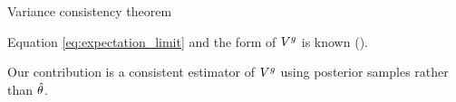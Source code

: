 \begin{frame}[t]{Variance consistency theorem}

\pause
Equation \ref{eq:expectation_limit} and the form of  $V^g$ is known (\citep{kleijn:2012:bvm}).  

Our contribution is a consistent estimator of $V^g$ using posterior samples 
rather than $\hat\theta$.

\end{frame}